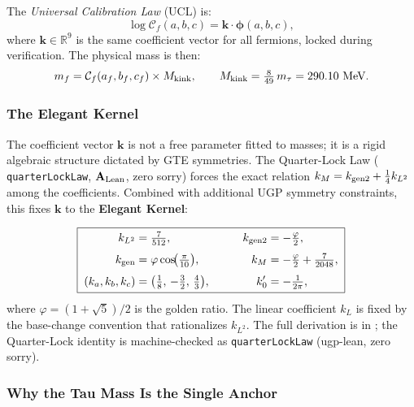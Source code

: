 \documentclass[11pt,openany]{book}
\theoremstyle{remark}
\newcommand{\lean}[1]{%
  \penalty-100
  \begingroup\def\_{\textunderscore\allowbreak}\texttt{#1}\endgroup}
\newcommand{\Mkink}{M_{\rm kink}}
\newcommand{\CatA}{\textbf{A}}
\newcommand{\CatAL}{\ensuremath{\textbf{A}_{\rm Lean}}}
\begin{document}
The \emph{Universal Calibration Law} (UCL) is:
\begin{equation}
  \log \mathcal{C}_f(a,b,c) = \mathbf{k} \cdot \boldsymbol{\phi}(a,b,c),
  \label{eq:ucl}
\end{equation}
where $\mathbf{k} \in \mathbb{R}^9$ is the same coefficient vector for all fermions,
locked during verification.  The physical mass is then:
\begin{equation}
  m_f = \mathcal{C}_f(a_f, b_f, c_f) \times \Mkink, \qquad
  \Mkink = \tfrac{8}{49}\,m_\tau = 290.10~\text{MeV}.
  \label{eq:mass_from_cf}
\end{equation}

\subsubsection*{The Elegant Kernel}

The coefficient vector $\mathbf{k}$ is not a free parameter fitted to masses; it is
a rigid algebraic structure dictated by GTE symmetries.  The Quarter-Lock Law
(\lean{quarterLockLaw}, \CatAL, zero sorry) forces the exact relation
$k_M = k_{\rm gen2} + \tfrac{1}{4}k_{L^2}$ among the coefficients.  Combined with
additional UGP symmetry constraints, this fixes $\mathbf{k}$ to the
\textbf{Elegant Kernel}:

\begin{tcolorbox}[colback=yellow!5,colframe=yellow!75!black,
  title={\textbf{The Elegant Kernel} (UCL coefficient vector, \CatA)}]
\begin{equation}
\boxed{\;\begin{aligned}
k_{L^2} &= \tfrac{7}{512}, \qquad & k_{\rm gen2} &= -\tfrac{\varphi}{2}, \\[3pt]
k_{\rm gen} &= \varphi\cos\!\bigl(\tfrac{\pi}{10}\bigr), \qquad &
k_M &= -\tfrac{\varphi}{2} + \tfrac{7}{2048}, \\[3pt]
(k_a, k_b, k_c) &= \bigl(\tfrac{1}{8},\, -\tfrac{3}{2},\, \tfrac{4}{3}\bigr), \qquad &
k_0' &= -\tfrac{1}{2\pi},
\end{aligned}\;}
\label{eq:elegant_kernel_p48}
\end{equation}
where $\varphi = (1+\sqrt{5})/2$ is the golden ratio.
The linear coefficient $k_L$ is fixed by the base-change convention that rationalizes $k_{L^2}$.
The full derivation is in \cite{Spivack2025UGP}; the Quarter-Lock identity is
machine-checked as \lean{quarterLockLaw} (ugp-lean, zero sorry).
\end{tcolorbox}

\subsubsection*{Why the Tau Mass Is the Single Anchor}
\end{document}
